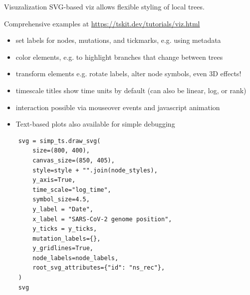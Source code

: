 \documentclass[landscape,a0paper,fontscale=0.4]{baposter}
\newcommand{\compresslist}{%
 \setlength{\itemsep}{1pt}%
 \setlength{\parskip}{0pt}%
 \setlength{\parsep}{0pt}%
 }
\begin{document}
\begin{poster}
\begin{posterbox}[name=viz,column=1,row=0,span=2,below=overview]{Visuzalization}
SVG-based viz allows flexible styling of local trees.

Comprehensive examples at \url{https://tskit.dev/tutorials/viz.html}


% 
% 

\begin{multicols}{2}

\begin{itemize} \compresslist
    \item set labels for nodes, mutations, and tickmarks, e.g. using metadata
    \item color elements, e.g. to highlight branches that change between trees
    \item transform elements e.g. rotate labels, alter node symbols, even 3D effects!
    \item timescale titles show time units by default (can also be linear, log, or rank)
    \item interaction possible via mouseover events and javascript animation
    \item Text-based plots also available for simple debugging
\end{itemize}

% 
% 

\begin{verbatim}
    svg = simp_ts.draw_svg(
        size=(800, 400),
        canvas_size=(850, 405),
        style=style + "".join(node_styles),
        y_axis=True,
        time_scale="log_time",
        symbol_size=4.5,
        y_label = "Date",
        x_label = "SARS-CoV-2 genome position",
        y_ticks = y_ticks,
        mutation_labels={},
        y_gridlines=True,
        node_labels=node_labels,
        root_svg_attributes={"id": "ns_rec"},
    )
    svg
\end{verbatim}


\end{multicols}
\end{posterbox}
\end{poster}
\end{document}
